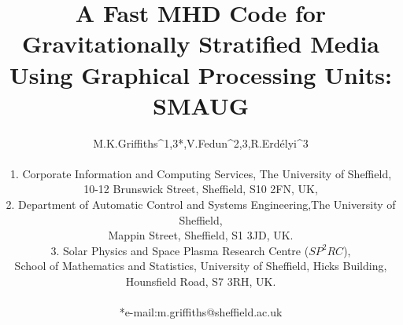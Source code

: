 





\newcommand\aap{{AA}}%
\newcommand\apj{{AJ}}
\newcommand\apjl{{AJL}}
\newcommand\jcp{{J. Comput. Phys.}}
\newcommand\solphys{{SP}}
\newcommand\mnras{{MNRAS}}


\usepackage{amsmath}
\usepackage{amssymb}
\usepackage{hyperref}

\usepackage{natbib}




\title[MHD Code for Gravitationally Stratified Media Using GPUs]{A Fast MHD Code for Gravitationally Stratified Media Using Graphical Processing Units: SMAUG}
\author[M.K. Griffiths et al.]{M.K.Griffiths^{1,3*},V.Fedun^{2,3},R.Erd\'{e}lyi^{3}\\
\\
1. Corporate Information and Computing Services, The University of Sheffield,\\
10-12 Brunswick Street, Sheffield, S10 2FN, UK,\\
2. Department of Automatic Control and Systems Engineering,The University of Sheffield,\\
 Mappin Street, Sheffield, S1 3JD, UK.\\
3. Solar Physics and Space Plasma Research Centre ($SP^{2}RC$),\\
School of Mathematics and Statistics, University of Sheffield, Hicks Building,\\
Hounsfield Road, S7 3RH, UK.\\
\\
*e-mail:m.griffiths@sheffield.ac.uk
}





